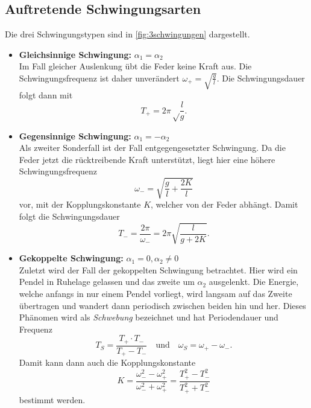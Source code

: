 \subsection{Auftretende Schwingungsarten}
\label{sec:Auftretende Schwingungsarten}
Die drei Schwingungstypen sind in \autoref{fig:3schwingungen} dargestellt.
\begin{itemize}
	\item \textbf{Gleichsinnige Schwingung:} $\alpha_1 = \alpha_2$ \\
		Im Fall gleicher Auslenkung übt die Feder keine Kraft aus. Die
		Schwingungsfrequenz ist daher unverändert $\omega_+ = \sqrt{\frac{g}{l}}$.
		Die Schwingungsdauer folgt dann mit
		\begin{equation}
			T_+ = 2\pi \sqrt\frac{l}{g}.
			\label{eqn:T_+}
		\end{equation}
	\item \textbf{Gegensinnige Schwingung:} $\alpha_1 = -\alpha_2$ \\
		Als zweiter Sonderfall ist der Fall entgegengesetzter Schwingung. Da die
		Feder jetzt die rücktreibende Kraft unterstützt, liegt hier eine höhere
		Schwingungsfrequenz 
		\[
			\omega_- = \sqrt{\frac gl + \frac{2K}{l}}
		\]
		vor, mit der Kopplungskonstante $K$, welcher von der Feder abhängt. 
		Damit folgt die Schwingungsdauer
		\[
			T_- = \frac{2\pi}{\omega_-} = 2\pi \sqrt{\frac{l}{g+2K}}.
		\]
	\item \textbf{Gekoppelte Schwingung:} $\alpha_1 = 0, \alpha_2 \neq 0$ \\
		Zuletzt wird der Fall der gekoppelten Schwingung betrachtet. Hier wird ein
		Pendel in Ruhelage gelassen und das zweite um $\alpha_2$ ausgelenkt. Die
		Energie, welche anfangs in nur einem Pendel vorliegt, wird langsam auf das
		Zweite übertragen und wandert dann periodisch zwischen beiden hin und her.
		Dieses Phänomen wird als \textit{Schwebung} bezeichnet und hat
		Periodendauer und Frequenz
		\[
			T_S = \frac{T_+ \cdot T_-}{T_+ - T_-}
			\quad
			\text{und}
			\quad
			\omega_S = \omega_+ - \omega_-.
		\]
		Damit kann dann auch die Kopplungskonstante 
		\begin{equation}
			K = \frac{\omega_-^2 - \omega_+^2}{\omega_-^2 + \omega_+^2}
			=\frac{T_+^2 - T_-^2}{T_+^2 + T_-^2}
			\label{eqn:kopplungskonstante}
		\end{equation}
		bestimmt werden.
\end{itemize}

